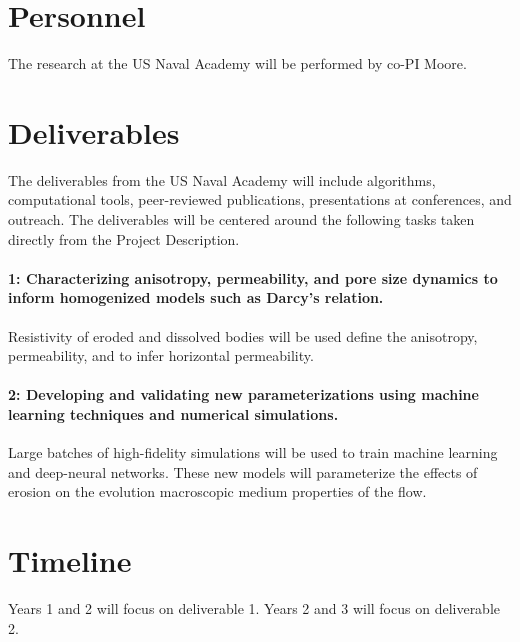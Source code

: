 \documentclass[11pt]{article}
\begin{document}
\section*{Personnel}
The research at the US Naval Academy will be performed by co-PI Moore.

\section*{Deliverables}
The deliverables from the US Naval Academy will include algorithms,
computational tools, peer-reviewed publications, presentations at
conferences, and outreach. The deliverables will be centered around the
following tasks taken directly from the Project Description. 

\paragraph{1: Characterizing anisotropy, permeability, and pore size
dynamics to inform homogenized models such as Darcy’s relation.}
Resistivity of eroded and dissolved bodies will be used define the
anisotropy, permeability, and to infer horizontal permeability.

\paragraph{2: Developing and validating new parameterizations using machine
learning techniques and numerical simulations.} Large batches of
high-fidelity simulations will be used to train machine learning and
deep-neural networks. These new models will parameterize the effects of
erosion on the evolution macroscopic medium properties of the flow.


\section*{Timeline}
Years 1 and 2 will focus on deliverable 1. Years 2 and 3 will focus on
deliverable 2.
\end{document}
